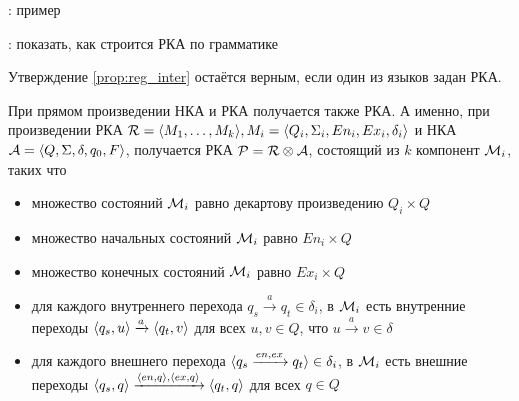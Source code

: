 \TODO: пример

\TODO: показать, как строится РКА по грамматике

\begin{proposition}\cite{Alur05}
  Утверждение \ref{prop:reg_inter} остаётся верным, если один из языков задан РКА. 
\end{proposition}

При прямом произведении НКА и РКА получается также РКА. А именно, при произведении РКА $\mathcal{R} = \langle M_1, \dots, M_k \rangle,  M_i = \langle Q_i, \Sigma_i, En_i, Ex_i, \delta_i \rangle$ и НКА $\mathcal{A} = \langle Q, \Sigma, \delta, q_0, F \rangle$, получается РКА $\mathcal{P} = \mathcal{R} \otimes \mathcal{A}$, состоящий из $k$ компонент $\mathcal{M}_i$, таких что
  \vspace{-\topsep}
  \begin{itemize}
    \setlength\itemsep{-0.1em}
    \item множество состояний $\mathcal{M}_i$ равно декартову произведению $Q_i \times Q$
    \item множество начальных состояний $\mathcal{M}_i$ равно $En_i \times Q$
    \item множество конечных  состояний $\mathcal{M}_i$ равно $Ex_i \times Q$
    \item для каждого внутреннего перехода $q_s \xrightarrow{a} q_t \in \delta_i$, в $\mathcal{M}_i$ есть внутренние переходы $\langle q_s, u \rangle \xrightarrow{a} \langle q_t, v \rangle$ для всех $u, v \in Q$, что $u \xrightarrow{a} v \in \delta$
    \item для каждого внешнего перехода $\langle q_s \xrightarrow{en, ex} q_t \rangle \in \delta_i$, в $\mathcal{M}_i$ есть внешние переходы $\langle q_s, q \rangle \xrightarrow{\langle en, q \rangle, \langle ex, q \rangle} \langle q_t, q \rangle$ для всех $q \in Q$
  \end{itemize}



    





